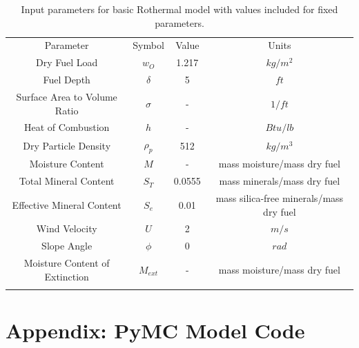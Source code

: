 \documentclass[11pt]{article}
\begin{document}
\begin{table}[h]
\caption{Input parameters for basic Rothermal model with values included for fixed parameters.}
\begin{center}
  \begin{tabular}{cccc}
    \hline\noalign{\smallskip}
    Parameter & Symbol & Value & Units \\
    \noalign{\smallskip}\hline\noalign{\smallskip}
    Dry Fuel Load & $w_O$ & 1.217 & $kg/m^2$ \\
    Fuel Depth & $\delta$ & 5 & $ft$ \\ 
    Surface Area to Volume Ratio & $\sigma$ & - & $1/ft$ \\ 
    Heat of Combustion & $h$ & - & $Btu/lb$ \\ 
    Dry Particle Density & $\rho_p$ & 512 & $kg/m^3$\\ 
    Moisture Content & $M$ & - & mass moisture/mass dry fuel \\ 
    Total Mineral Content & $S_T$ & 0.0555 & mass minerals/mass dry fuel \\
    Effective Mineral Content & $S_e$ & 0.01 & mass silica-free minerals/mass dry fuel \\
    Wind Velocity & $U$ & 2 & $m/s$ \\
    Slope Angle & $\phi$ & 0 & $rad$ \\
    Moisture Content of Extinction & $M_{ext}$ & - & mass moisture/mass dry fuel \\
    \noalign{\smallskip}\hline
  \end{tabular}
\end{center}
\label{tab:para}
\end{table}

\section{Appendix: PyMC Model Code}

% 
% 
\end{document}
